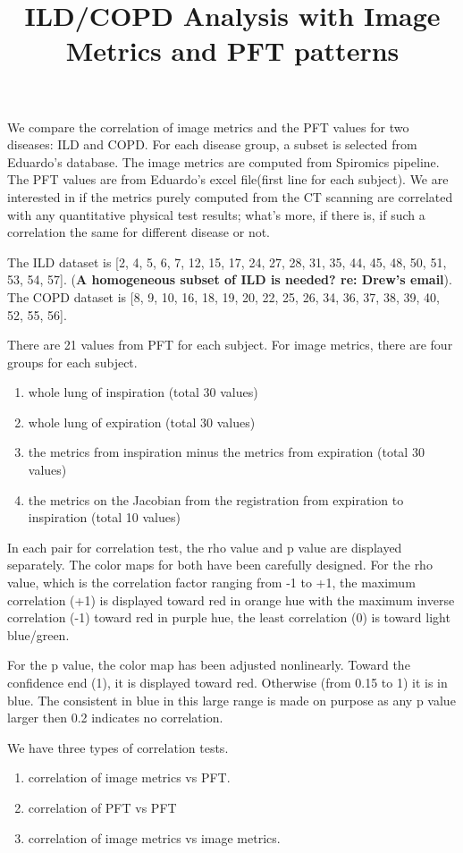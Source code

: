 \documentclass[12pt]{article}
\title{ILD/COPD Analysis with Image Metrics and PFT patterns}
\date{}
\begin{document}
\maketitle

We compare the correlation of image metrics and the PFT values for two diseases: ILD and COPD. For each disease group, a subset is selected from Eduardo's database. The image metrics are computed from Spiromics pipeline. The PFT values are from Eduardo's excel file(first line for each subject). We are interested in if the metrics purely computed from the CT scanning are correlated with any quantitative physical test results; what's more, if there is, if such a correlation the same for different disease or not.

The ILD dataset is [2, 4, 5, 6, 7, 12, 15, 17, 24, 27, 28, 31, 35, 44, 45, 48, 50, 51, 53, 54, 57]. (\textbf{A homogeneous subset of ILD is needed? re: Drew's email}). The COPD dataset is [8, 9, 10, 16, 18, 19, 20, 22, 25, 26, 34, 36, 37, 38, 39, 40, 52, 55, 56].


There are 21 values from PFT for each subject. For image metrics, there are four groups for each subject. 
\begin{enumerate}
 \item whole lung of inspiration (total 30 values)
 \item whole lung of expiration (total 30 values)
 \item the metrics from inspiration minus the metrics from expiration (total 30 values)
 \item the metrics on the Jacobian from the registration from expiration to inspiration (total 10 values)
\end{enumerate}

In each pair for correlation test, the rho value and p value are displayed separately. The color maps for both have been carefully designed. For the rho value, which is the correlation factor ranging from -1 to +1, the maximum correlation (+1) is displayed toward red in orange hue with the maximum inverse correlation (-1) toward red in purple hue, the least correlation (0) is toward light blue/green. 

For the p value, the color map has been adjusted nonlinearly. Toward the confidence end (1), it is displayed toward red. Otherwise (from 0.15 to 1) it is in blue. The consistent in blue in this large range is made on purpose as any p value larger then 0.2 indicates no correlation.

We have three types of correlation tests. 
\begin{enumerate}
 \item correlation of image metrics vs PFT.
 \item correlation of PFT vs PFT
 \item correlation of image metrics vs image metrics.
\end{enumerate}
\end{document}
